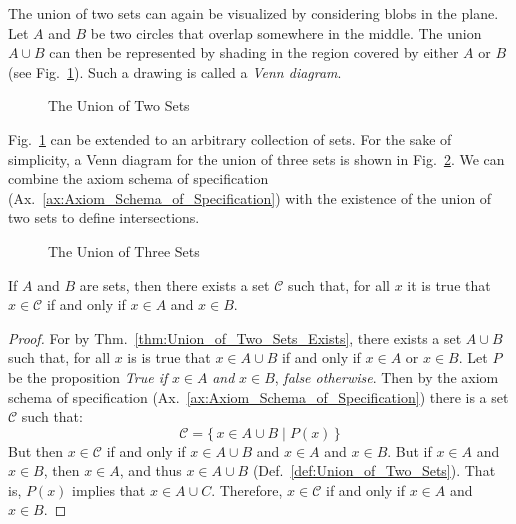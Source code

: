         The union of two sets can again be visualized by considering blobs
        in the plane. Let $A$ and $B$ be two circles that overlap somewhere in
        the middle. The union $A\cup{B}$ can then be represented by shading in
        the region covered by either $A$ or $B$
        (see Fig.~\ref{fig:Union_of_Two_Sets}). Such a drawing is called a
        \textit{Venn diagram}.
        \begin{figure}[H]
            \centering
            \captionsetup{type=figure}
            
            \caption{The Union of Two Sets}
            \label{fig:Union_of_Two_Sets}
        \end{figure}
        Fig.~\ref{fig:Union_of_Two_Sets} can be extended to an
        arbitrary collection of sets. For the sake of simplicity, a Venn
        diagram for the union of three sets is shown in
        Fig.~\ref{fig:Union_of_Three_Sets}. We can combine the axiom schema of
        specification (Ax.~\ref{ax:Axiom_Schema_of_Specification}) with the
        existence of the union of two sets to define intersections.
        \begin{figure}[H]
            \centering
            \captionsetup{type=figure}
            
            \caption{The Union of Three Sets}
            \label{fig:Union_of_Three_Sets}
        \end{figure}
        \begin{theorem}
            If $A$ and $B$ are sets, then there exists a set $\mathcal{C}$
            such that, for all $x$ it is true that $x\in\mathcal{C}$ if and
            only if $x\in{A}$ and $x\in{B}$.
        \end{theorem}
        \begin{proof}
            For by Thm.~\ref{thm:Union_of_Two_Sets_Exists}, there exists
            a set $A\cup{B}$ such that, for all $x$ is is true that
            $x\in{A}\cup{B}$ if and only if $x\in{A}$ or $x\in{B}$. Let
            $P$ be the proposition \textit{True if} $x\in{A}$ \textit{and}
            $x\in{B}$, \textit{false otherwise}. Then by the axiom schema
            of specification (Ax.~\ref{ax:Axiom_Schema_of_Specification})
            there is a set $\mathcal{C}$ such that:
            \begin{equation}
                \mathcal{C}=\big\{\,x\in{A}\cup{B}\;|\;P(x)\,\big\}
            \end{equation}
            But then $x\in\mathcal{C}$ if and only if $x\in{A}\cup{B}$ and
            $x\in{A}$ and $x\in{B}$. But if $x\in{A}$ and $x\in{B}$, then
            $x\in{A}$, and thus $x\in{A}\cup{B}$
            (Def.~\ref{def:Union_of_Two_Sets}). That is, $P(x)$ implies that
            $x\in{A}\cup{C}$. Therefore, $x\in\mathcal{C}$
            if and only if $x\in{A}$ and $x\in{B}$.
        \end{proof}
